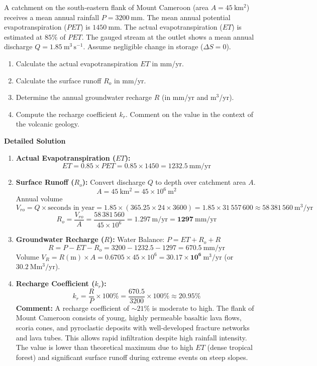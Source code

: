 \documentclass[11pt]{article}
\begin{document}
\begin{exoresolu}
A catchment on the south-eastern flank of Mount Cameroon (area $A = 45\ \mathrm{km^2}$) receives a mean annual rainfall $P = 3200\ \mathrm{mm}$. The mean annual potential evapotranspiration ($PET$) is $1450\ \mathrm{mm}$. The actual evapotranspiration ($ET$) is estimated at $85\%$ of $PET$. The gauged stream at the outlet shows a mean annual discharge $Q = 1.85\ \mathrm{m^3\,s^{-1}}$. Assume negligible change in storage ($\Delta S = 0$).
\begin{enumerate}
    \item Calculate the actual evapotranspiration $ET$ in mm/yr.
    \item Calculate the surface runoff $R_o$ in mm/yr.
    \item Determine the annual groundwater recharge $R$ (in mm/yr and m$^3$/yr).
    \item Compute the recharge coefficient $k_r$. Comment on the value in the context of the volcanic geology.
\end{enumerate}
\tcblower
\textbf{Detailed Solution}
\begin{enumerate}
    \item \textbf{Actual Evapotranspiration ($ET$):}
    \[ ET = 0.85 \times PET = 0.85 \times 1450 = \mathbf{1232.5\ \mathrm{mm/yr}} \]
    \item \textbf{Surface Runoff ($R_o$):}
    Convert discharge $Q$ to depth over catchment area $A$.
    \[ A = 45\ \mathrm{km^2} = 45 \times 10^6\ \mathrm{m^2} \]
    Annual volume \[ V_{ro} = Q \times \text{seconds in year} = 1.85 \times (365.25 \times 24 \times 3600) = 1.85 \times 31\,557\,600 \approx 58\,381\,560\ \mathrm{m^3/yr} \]
    \[ R_o = \frac{V_{ro}}{A} = \frac{58\,381\,560}{45 \times 10^6} = 1.297\ \mathrm{m/yr} = \mathbf{1297\ \mathrm{mm/yr}} \]
    \item \textbf{Groundwater Recharge ($R$):}
    Water Balance: $P = ET + R_o + R$
    \[ R = P - ET - R_o = 3200 - 1232.5 - 1297 = \mathbf{670.5\ \mathrm{mm/yr}} \]
    Volume $V_R = R(\text{m}) \times A = 0.6705 \times 45 \times 10^6 = \mathbf{30.17 \times 10^6\ \mathrm{m^3/yr}}$ (or $30.2\ \mathrm{Mm^3/yr}$).
    \item \textbf{Recharge Coefficient ($k_r$):}
    \[ k_r = \frac{R}{P} \times 100\% = \frac{670.5}{3200} \times 100\% \approx \mathbf{20.95\%} \]
    \textbf{Comment:} A recharge coefficient of $\sim 21\%$ is moderate to high. The flank of Mount Cameroon consists of young, highly permeable basaltic lava flows, scoria cones, and pyroclastic deposits with well-developed fracture networks and lava tubes. This allows rapid infiltration despite high rainfall intensity. The value is lower than theoretical maximum due to high $ET$ (dense tropical forest) and significant surface runoff during extreme events on steep slopes.
\end{enumerate}
\end{exoresolu}
\end{document}
